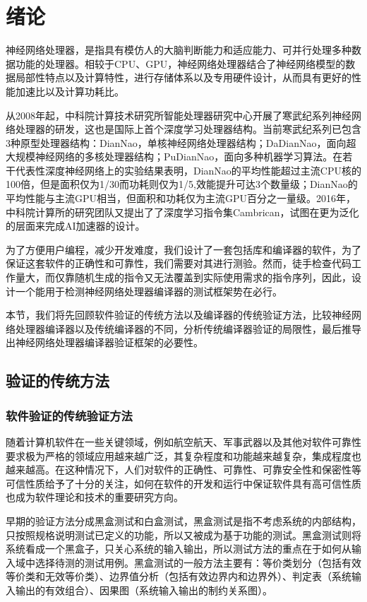 ﻿\chapter{绪论}
神经网络处理器，是指具有模仿人的大脑判断能力和适应能力、可并行处理多种数据功能的处理器。相较于CPU、GPU，神经网络处理器结合了神经网络模型的数据局部性特点以及计算特性，进行存储体系以及专用硬件设计，从而具有更好的性能加速比以及计算功耗比。

从2008年起，中科院计算技术研究所智能处理器研究中心开展了寒武纪系列神经网络处理器的研发，这也是国际上首个深度学习处理器结构。当前寒武纪系列已包含3种原型处理器结构：DianNao，单核神经网络处理器结构；DaDianNao，面向超大规模神经网络的多核处理器结构；PuDianNao，面向多种机器学习算法。在若干代表性深度神经网络上的实验结果表明，DianNao的平均性能超过主流CPU核的100倍，但是面积仅为1/30而功耗则仅为1/5,效能提升可达3个数量级；DianNao的平均性能与主流GPU相当，但面积和功耗仅为主流GPU百分之一量级。2016年，中科院计算所的研究团队又提出了了深度学习指令集Cambrican，试图在更为泛化的层面来完成AI加速器的设计。

为了方便用户编程，减少开发难度，我们设计了一套包括库和编译器的软件，为了保证这套软件的正确性和可靠性，我们需要对其进行测验。然而，徒手检查代码工作量大，而仅靠随机生成的指令又无法覆盖到实际使用需求的指令序列，因此，设计一个能用于检测神经网络处理器编译器的测试框架势在必行。

本节，我们将先回顾软件验证的传统方法以及编译器的传统验证方法，比较神经网络处理器编译器以及传统编译器的不同，分析传统编译器验证的局限性，最后推导出神经网络处理器编译器验证框架的必要性。

\section{验证的传统方法}
\subsection{软件验证的传统验证方法}
随着计算机软件在一些关键领域，例如航空航天、军事武器以及其他对软件可靠性要求极为严格的领域应用越来越广泛，其复杂程度和功能越来越复杂，集成程度也越来越高。在这种情况下，人们对软件的正确性、可靠性、可靠安全性和保密性等可信性质给予了十分的关注，如何在软件的开发和运行中保证软件具有高可信性质也成为软件理论和技术的重要研究方向。

早期的验证方法分成黑盒测试和白盒测试，黑盒测试是指不考虑系统的内部结构，只按照规格说明测试已定义的功能，所以又被成为基于功能的测试。黑盒测试则将系统看成一个黑盒子，只关心系统的输入输出，所以测试方法的重点在于如何从输入域中选择待测的测试用例。黑盒测试的一般方法主要有：等价类划分（包括有效等价类和无效等价类）、边界值分析（包括有效边界内和边界外）、判定表（系统输入输出的有效组合）、因果图（系统输入输出的制约关系图）。

